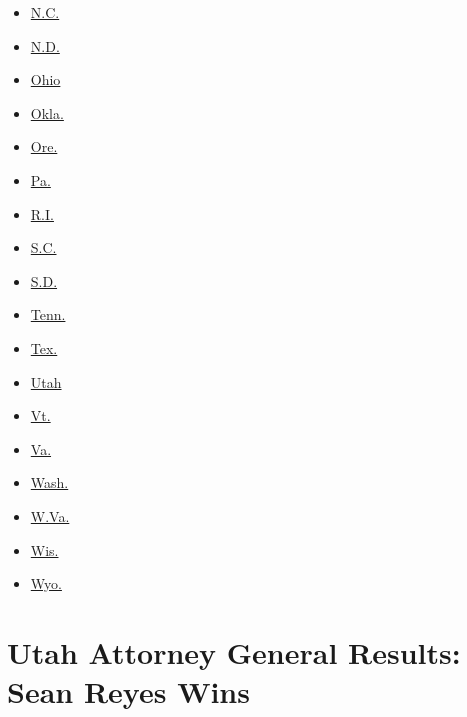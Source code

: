 \begin{itemize}
\tightlist
\item
  \href{//www.nytimes3xbfgragh.onion/elections/2016/results/north-carolina}{N.C.}
\item
  \href{//www.nytimes3xbfgragh.onion/elections/2016/results/north-dakota}{N.D.}
\item
  \href{//www.nytimes3xbfgragh.onion/elections/2016/results/ohio}{Ohio}
\item
  \href{//www.nytimes3xbfgragh.onion/elections/2016/results/oklahoma}{Okla.}
\item
  \href{//www.nytimes3xbfgragh.onion/elections/2016/results/oregon}{Ore.}
\item
  \href{//www.nytimes3xbfgragh.onion/elections/2016/results/pennsylvania}{Pa.}
\item
  \href{//www.nytimes3xbfgragh.onion/elections/2016/results/rhode-island}{R.I.}
\item
  \href{//www.nytimes3xbfgragh.onion/elections/2016/results/south-carolina}{S.C.}
\item
  \href{//www.nytimes3xbfgragh.onion/elections/2016/results/south-dakota}{S.D.}
\item
  \href{//www.nytimes3xbfgragh.onion/elections/2016/results/tennessee}{Tenn.}
\item
  \href{//www.nytimes3xbfgragh.onion/elections/2016/results/texas}{Tex.}
\end{itemize}

\begin{itemize}
\tightlist
\item
  \href{//www.nytimes3xbfgragh.onion/elections/2016/results/utah}{Utah}
\item
  \href{//www.nytimes3xbfgragh.onion/elections/2016/results/vermont}{Vt.}
\item
  \href{//www.nytimes3xbfgragh.onion/elections/2016/results/virginia}{Va.}
\item
  \href{//www.nytimes3xbfgragh.onion/elections/2016/results/washington}{Wash.}
\item
  \href{//www.nytimes3xbfgragh.onion/elections/2016/results/west-virginia}{W.Va.}
\item
  \href{//www.nytimes3xbfgragh.onion/elections/2016/results/wisconsin}{Wis.}
\item
  \href{//www.nytimes3xbfgragh.onion/elections/2016/results/wyoming}{Wyo.}
\end{itemize}

\hypertarget{utah-attorney-general-results-sean-reyes-wins}{%
\section{Utah Attorney General Results: Sean Reyes
Wins}\label{utah-attorney-general-results-sean-reyes-wins}}

